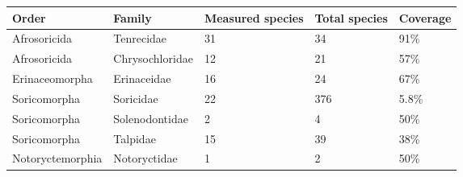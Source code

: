 

\begin{tabular}{p{3.4cm}p{3cm}p{2cm}p{2cm}p{2cm}}

\hline
\textbf{Order} & \textbf{Family} & \textbf{Measured species} & \textbf{Total species} & \textbf{Coverage} \\
\hline
Afrosoricida & Tenrecidae & 31 & 34 & 91\% \\
Afrosoricida & Chrysochloridae & 12 & 21 & 57\% \\
Erinaceomorpha & Erinaceidae & 16 & 24 & 67\% \\
Soricomorpha & Soricidae & 22 & 376 & 5.8\% \\
Soricomorpha & Solenodontidae & 2 & 4 & 50\% \\
Soricomorpha & Talpidae & 15 & 39 & 38\% \\
Notoryctemorphia & Notoryctidae & 1 & 2 & 50\% \\
\hline

\end{tabular}

